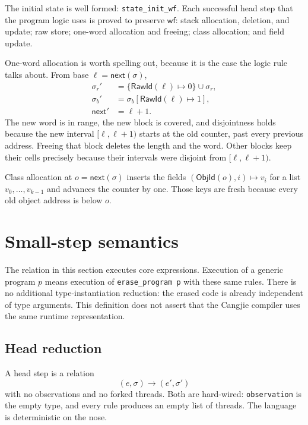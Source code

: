 \documentclass[11pt]{article}
\newcommand{\step}{\longrightarrow}
\newcommand{\WF}{\mathsf{wf}}
\begin{document}
The initial state is well formed: \texttt{state\_init\_wf}.
Each successful head step that the program logic uses is proved to preserve \(\WF\): stack allocation, deletion, and update; raw store; one-word allocation and freeing; class allocation; and field update.

One-word allocation is worth spelling out, because it is the case the logic rule talks about.
From base \(\ell=\mathsf{next}(\sigma)\),
\[
\begin{aligned}
\sigma_{r}' &= \{\mathsf{RawId}(\ell) \mapsto 0\} \cup \sigma_{r},\\
\sigma_{b}' &= \sigma_{b}[\mathsf{RawId}(\ell)\mapsto 1],\\
\mathsf{next}' &= \ell+1.
\end{aligned}
\]
The new word is in range, the new block is covered, and disjointness holds because the new interval \([\ell,\ell+1)\) starts at the old counter, past every previous address.
Freeing that block deletes the length and the word.
Other blocks keep their cells precisely because their intervals were disjoint from \([\ell,\ell+1)\).

Class allocation at \(o=\mathsf{next}(\sigma)\) inserts the fields \((\mathsf{ObjId}(o), i) \mapsto v_i\) for a list \(v_0,\ldots,v_{k-1}\) and advances the counter by one.
Those keys are fresh because every old object address is below \(o\).

\section{Small-step semantics}

The relation in this section executes core expressions. Execution of a
generic program \(p\) means execution of \texttt{erase\_program p} with
these same rules. There is no additional type-instantiation reduction:
the erased code is already independent of type arguments. This definition
does not assert that the Cangjie compiler uses the same runtime representation.

\subsection{Head reduction}

A head step is a relation
\[
(e,\sigma) \step (e',\sigma')
\]
with no observations and no forked threads.
Both are hard-wired: \texttt{observation} is the empty type, and every rule produces an empty list of threads.
The language is deterministic on the nose.
\end{document}

